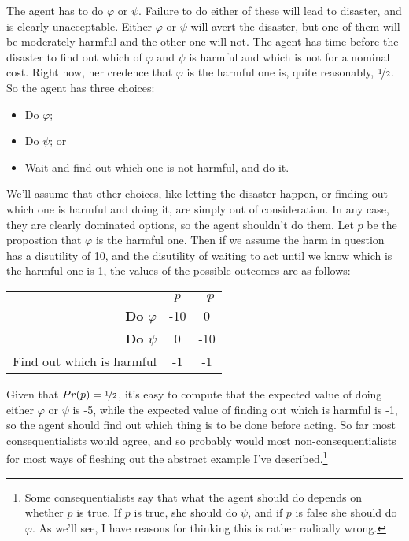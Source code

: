 The agent has to do $\varphi$ or $\psi$. Failure to do either of these will lead to disaster, and is clearly unacceptable. Either $\varphi$ or $\psi$ will avert the disaster, but one of them will be moderately harmful and the other one will not. The agent has time before the disaster to find out which of $\varphi$ and $\psi$ is harmful and which is not for a nominal cost. Right now, her credence that $\varphi$ is the harmful one is, quite reasonably, $\nicefrac{1}{2}$. So the agent has three choices:

\begin{itemize}
\item Do $\varphi$;
\item Do $\psi$; or
\item Wait and find out which one is not harmful, and do it.
\end{itemize}

\noindent We'll assume that other choices, like letting the disaster happen, or finding out which one is harmful and doing it, are simply out of consideration. In any case, they are clearly dominated options, so the agent shouldn't do them. Let $p$ be the propostion that $\varphi$ is the harmful one. Then if we assume the harm in question has a disutility of 10, and the disutility of waiting to act until we know which is the harmful one is 1, the values of the possible outcomes are as follows:

\begin{center}
\begin{tabular}{r c c}
 & $p$ & $\neg p$ \\
\textbf{Do $\varphi$} & -10 & 0 \\
\textbf{Do $\psi$} & 0 & -10 \\
Find out which is harmful & -1 & -1 \\
\end{tabular}
\end{center}

\noindent Given that $Pr(p) = \nicefrac{1}{2}$, it's easy to compute that the expected value of doing either $\varphi$ or $\psi$ is -5, while the expected value of finding out which is harmful is -1, so the agent should find out which thing is to be done before acting. So far most consequentialists would agree, and so probably would most non-consequentialists for most ways of fleshing out the abstract example I've described.\footnote{Some consequentialists say that what the agent should do depends on whether $p$ is true. If $p$ is true, she should do $\psi$, and if $p$ is false she should do $\varphi$. As we'll see, I have reasons for thinking this is rather radically wrong.}

